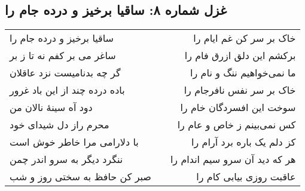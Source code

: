 \begin{center}
\section*{غزل شماره ۸: ساقیا برخیز و درده جام را}
\label{sec:sh008}
\begin{longtable}{l p{0.5cm} r}
ساقیا برخیز و درده جام را
&&
خاک بر سر کن غم ایام را
\\
ساغر می بر کفم نه تا ز بر
&&
برکشم این دلق ازرق فام را
\\
گر چه بدنامیست نزد عاقلان
&&
ما نمی‌خواهیم ننگ و نام را
\\
باده درده چند از این باد غرور
&&
خاک بر سر نفس نافرجام را
\\
دود آه سینهٔ نالان من
&&
سوخت این افسردگان خام را
\\
محرم راز دل شیدای خود
&&
کس نمی‌بینم ز خاص و عام را
\\
با دلارامی مرا خاطر خوش است
&&
کز دلم یک باره برد آرام را
\\
ننگرد دیگر به سرو اندر چمن
&&
هر که دید آن سرو سیم اندام را
\\
صبر کن حافظ به سختی روز و شب
&&
عاقبت روزی بیابی کام را
\\
\end{longtable}
\end{center}
